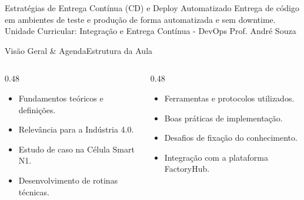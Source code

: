 
\senaicover
  {Estratégias de Entrega Contínua (CD) e Deploy Automatizado}
  {Entrega de código em ambientes de teste e produção de forma automatizada e sem downtime.}
  {Unidade Curricular: Integração e Entrega Contínua - DevOps}
  {Prof. André Souza}

\begin{senaiframe}{Visão Geral \& Agenda}{Estrutura da Aula}
  \begin{columns}[t]
    \begin{column}{0.48\textwidth}
      \begin{tcolorbox}[senaibluecard, title={1. Conceitos Chave}]
        \begin{itemize}
          \item Fundamentos teóricos e definições.
          \item Relevância para a Indústria 4.0.
        \end{itemize}
      \end{tcolorbox}
      \vspace{4pt}
      \begin{tcolorbox}[senaiambercard, title={3. Aplicação Prática}]
        \begin{itemize}
          \item Estudo de caso na Célula Smart N1.
          \item Desenvolvimento de rotinas técnicas.
        \end{itemize}
      \end{tcolorbox}
    \end{column}
    \begin{column}{0.48\textwidth}
      \begin{tcolorbox}[senairedcard, title={2. Detalhamento Técnico}]
        \begin{itemize}
          \item Ferramentas e protocolos utilizados.
          \item Boas práticas de implementação.
        \end{itemize}
      \end{tcolorbox}
      \vspace{4pt}
      \begin{tcolorbox}[senaigreencard, title={4. Exercícios \& Avaliação}]
        \begin{itemize}
          \item Desafios de fixação do conhecimento.
          \item Integração com a plataforma FactoryHub.
        \end{itemize}
      \end{tcolorbox}
    \end{column}
  \end{columns}
\end{senaiframe}

